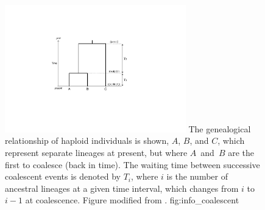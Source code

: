 

\begin{figure}[!htb]
\centering
\includegraphics[width=0.7\textwidth]{./img/ch1/info_coalescent}
{The genealogical relationship of  haploid individuals is shown, $A$, $B$, and $C$, which represent separate lineages at present, but where $A$~and~$B$ are the first to coalesce (back in time).
The waiting time between successive coalescent events is denoted by $T_i$, where $i$ is the number of ancestral lineages at a given time interval, which changes from $i$ to ${i-1}$ at coalescence.
Figure modified from \citet{nordborg2001coalescent}.}
{fig:info_coalescent}
\end{figure}
